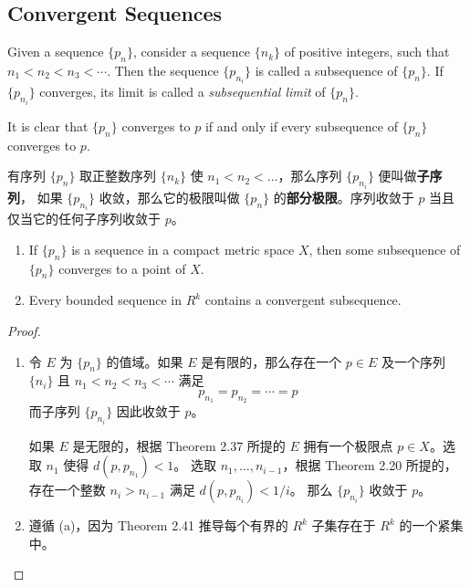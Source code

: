 \documentclass[../poma-notes.tex]{subfiles}
\begin{document}
\subsection*{Convergent Sequences}

\begin{definition}
  Given a sequence $\{p_n\}$, consider a sequence $\{n_k\}$ of positive integers, such that $n_1 < n_2 < n_3 < \cdots$.
  Then the sequence $\{p_{n_i}\}$ is called a subsequence of $\{p_n\}$. If $\{p_{n_i}\}$ converges, its limit is called
  a \textit{subsequential limit} of $\{p_n\}$.

  It is clear that $\{p_n\}$ converges to $p$ if and only if every subsequence of $\{p_n\}$ converges to $p$.
\end{definition}

\anote 有序列 $\{p_n\}$ 取正整数序列 $\{n_k\}$ 使 $n_1 < n_2 < \dots$，那么序列 $\{p_{n_i}\}$ 便叫做\textbf{子序列}，
如果 $\{p_{n_i}\}$ 收敛，那么它的极限叫做 $\{p_n\}$ 的\textbf{部分极限}。序列收敛于 $p$ 当且仅当它的任何子序列收敛于 $p$。

\begin{theorem}
  \begin{enumerate}[label=(\alph*)]
    \item If $\{p_n\}$ is a sequence in a compact metric space $X$, then some subsequence of $\{p_n\}$ converges to a
          point of $X$.
    \item Every bounded sequence in $R^k$ contains a convergent subsequence.
  \end{enumerate}
\end{theorem}

\begin{proof}
  \begin{enumerate}[label=(\alph*)]
    \item 令 $E$ 为 $\{p_n\}$ 的值域。如果 $E$ 是有限的，那么存在一个 $p\in E$ 及一个序列 $\{n_i\}$ 且 $n_1<n_2<n_3<\cdots$
          满足
          \[ p_{n_1} = p_{n_2} = \cdots = p \]
          而子序列 $\{p_{n_i}\}$ 因此收敛于 $p$。

          如果 $E$ 是无限的，根据 Theorem 2.37 所提的 $E$ 拥有一个极限点 $p \in X$。选取 $n_1$ 使得 $d(p,p_{n_1}) < 1$。
          选取 $n_1, \dots, n_{i-1}$，根据 Theorem 2.20 所提的，存在一个整数 $n_i > n_{i-1}$ 满足 $d(p, p_{n_i}) < 1/i$。
          那么 $\{p_{n_i}\}$ 收敛于 $p$。
    \item 遵循 (a)，因为 Theorem 2.41 推导每个有界的 $R^k$ 子集存在于 $R^k$ 的一个紧集中。
  \end{enumerate}
\end{proof}
\end{document}
